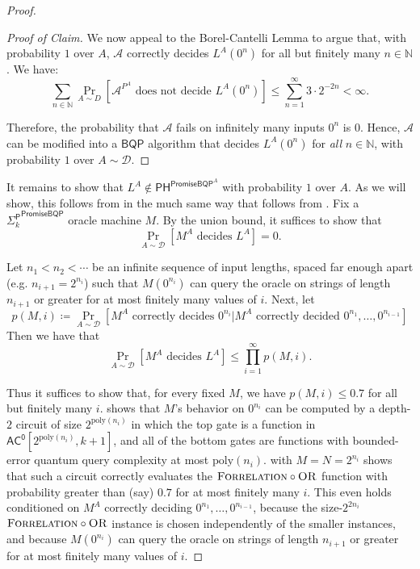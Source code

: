 \documentclass[11pt]{article}%
\newcommand{\Naturals}{\mathbb{N}}
\newcommand{\poly}{\mathrm{poly}}
\newcommand{\OR}{\normalfont\textsc{OR}}
\newcommand{\Forrelation}{\normalfont\textsc{Forrelation}}
\begin{document}
\begin{proof}
\begin{proof}[Proof of Claim]
We now appeal to the Borel-Cantelli Lemma to argue that, with probability $1$ over $A$, $\mathcal{A}$ correctly decides $L^A\left(0^{n}\right)$ for all but finitely many $n \in \Naturals$. We have:
\[
\sum_{n \in \Naturals} \Pr_{A\sim D}\left[\mathcal{A}^{P^A} \text{ does not decide } L^A\left(0^{n}\right)\right] \le \sum_{n=1}^{\infty} 3 \cdot 2^{-2n} < \infty.
\]

Therefore, the probability that $\mathcal{A}$ fails on infinitely many inputs $0^n$ is $0$. Hence, $\mathcal{A}$ can be modified into a $\mathsf{BQP}$ algorithm that decides $L^A\left(0^{n}\right)$ for \textit{all} $n \in \Naturals$, with probability $1$ over $A \sim \mathcal{D}$.
\end{proof}

It remains to show that $L^A \not\in \mathsf{PH}^{\mathsf{PromiseBQP}^A}$ with probability $1$ over $A$. As we will show, this follows from  in the much same way that  follows from . Fix a ${\mathsf{\Sigma}_k^\mathsf{P}}^\mathsf{PromiseBQP}$ oracle machine $M$. By the union bound, it suffices to show that
\[
\Pr_{A \sim \mathcal{D}}\left[M^A \text{ decides } L^A\right]=0.
\]

Let $n_1<n_2<\cdots$ be an infinite sequence of input lengths, spaced far enough apart (e.g. $n_{i+1}=2^{n_i}$) such that $M\left(0^{n_i}\right)$ can query the oracle on strings of length $n_{i+1}$ or greater for at most finitely many values of $i$. Next, let
\[
p(M,i)\coloneqq\Pr_{A \sim \mathcal{D}}\left[M^A \text{ correctly decides } 0^{n_i}|M^A \text{ correctly decided }0^{n_1},\dots,0^{n_{i-1}}\right]
\]
Then we have that
\[
\Pr_{A \sim \mathcal{D}}\left[M^A\text{ decides }L^A\right]\leq\prod_{i=1}^\infty p(M,i).
\]

\noindent Thus it suffices to show that, for every fixed $M$, we have $p(M,i)\leq 0.7$ for all but finitely many $i$.  shows that $M$'s behavior on $0^{n_i}$ can be computed by a depth-$2$ circuit of size $2^{\poly(n_i)}$ in which the top gate is a function in $\mathsf{AC^0}\left[2^{\poly(n_i)}, k+1\right]$, and all of the bottom gates are functions with bounded-error quantum query complexity at most $\poly(n_i)$.  with $M = N = 2^{n_i}$ shows that such a circuit correctly evaluates the $\Forrelation \circ \OR$ function with probability greater than (say) $0.7$ for at most finitely many $i$. This even holds conditioned on $M^A$ correctly deciding $0^{n_1},\ldots,0^{n_{i-1}}$, because the size-$2^{2n_i}$ $\Forrelation \circ \OR$ instance is chosen independently of the smaller instances, and because $M\left(0^{n_i}\right)$ can query the oracle on strings of length $n_{i+1}$ or greater for at most finitely many values of $i$.
\end{proof}
\end{document}
